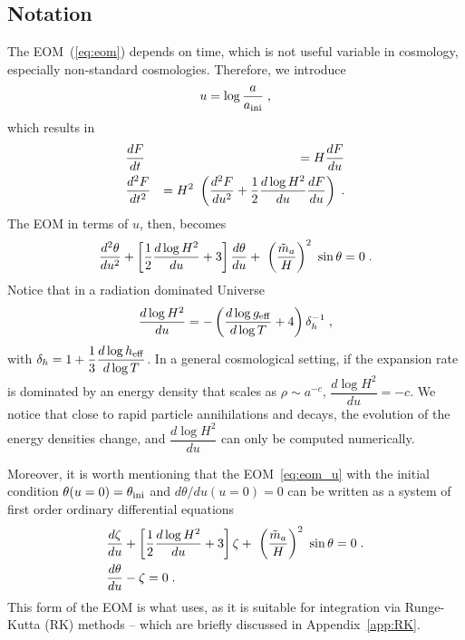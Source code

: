 \documentclass[11pt,a4paper]{article}
\begin{document}
\subsection{Notation}\label{sec:notation}
%
%
The EOM~(\ref{eq:eom}) depends on time, which is not useful variable in cosmology, especially non-standard cosmologies. Therefore, we introduce 
%
\begin{eqnarray}
	u = \log \dfrac{a}{a_{\rm ini}{}} \;,
	\label{eq:natation}
\end{eqnarray}
%
which results in 
%
\begin{eqnarray}
	&\dfrac{d F}{dt} &=  H  \dfrac{d F}{du} 
	\nonumber \\
	&\dfrac{d^2 F}{dt^2} &= H^2 \ \left(  \dfrac{d^2 F}{du^2} + \dfrac{1}{2} \dfrac{d \log H^2}{du}  \dfrac{d F}{du}  \right)\;.
	\label{eq:deriv_u}
\end{eqnarray}
%
The EOM in terms of $u$, then, becomes
%
\begin{equation}
	\dfrac{d^2  \theta}{du^2} + \left[ \dfrac{1}{2} \dfrac{d \log H^2}{du} + 3  \right] \dfrac{d  \theta}{d u} + \ \left( \dfrac{\tilde m_{a}{}}{H} \right)^2 \ \sin \theta
	=0 \;.
	\label{eq:eom_u}
\end{equation}
%
Notice that in a radiation dominated Universe
%
$$
\dfrac{d \log H^2}{du} = -\left(  \dfrac{d \log g_{\rm eff}{}}{d \log T} +4  \right) \delta_h^{-1}\;,
$$
with  $ \delta_h = 1+ \dfrac{1}{3} \dfrac{d \log h_{\rm eff}{}}{d \log T} $. 
%
In a general cosmological setting, if the expansion rate is dominated by an energy density that scales as $\rho \sim a^{-c}$, $\dfrac{d \log H^2}{du}  = -c$. 
%
We notice that close to rapid particle annihilations and decays, the evolution of the energy densities change, and $\dfrac{d \log H^2}{du}$ can only be computed numerically.

Moreover, it is worth mentioning that the EOM~\ref{eq:eom_u} with the initial condition $\theta(u=0)=\theta_{\rm ini}{}$ and $d\theta/du (u=0)=0$ can be written as a system of first 
order ordinary differential equations
%
\begin{eqnarray}
& \dfrac{d  \zeta}{du} + \left[ \dfrac{1}{2} \dfrac{d \log H^2}{du} + 3  \right] \zeta + \ \left( \dfrac{\tilde m_{a}{}}{H} \right)^2 \ \sin \theta
=0 \;.  \nonumber \\
&\dfrac{d \theta}{d u} - \zeta=0 \;.
\label{eq:eom_sys}
\end{eqnarray}
%
This form of the EOM is what \mimes uses, as it is suitable for integration via Runge-Kutta (RK) methods -- which are briefly discussed in Appendix~\ref{app:RK}.
\end{document}
